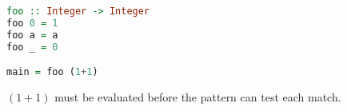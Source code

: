 \begin{figure}[h]
    \centering
    \begin{lstlisting}[language=Haskell]
foo :: Integer -> Integer
foo 0 = 1
foo a = a
foo _ = 0

main = foo (1+1)\end{lstlisting}
    \caption{$(1+1)$ must be evaluated before the pattern can test each match.}
    \label{fig:requires-steps}
\end{figure}